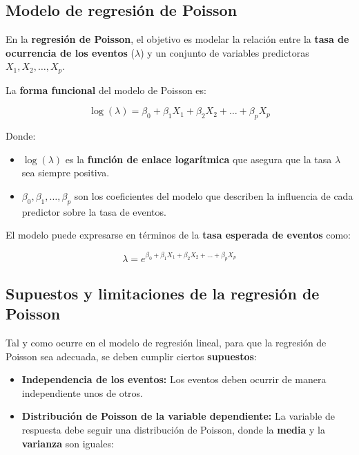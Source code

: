 \documentclass[
  letterpaper,
  DIV=11,
  numbers=noendperiod]{scrreprt}
\providecommand{\tightlist}{%
  \setlength{\itemsep}{0pt}\setlength{\parskip}{0pt}}
\begin{document}
\subsection{Modelo de regresión de
Poisson}\label{modelo-de-regresiuxf3n-de-poisson}

En la \textbf{regresión de Poisson}, el objetivo es modelar la relación
entre la \textbf{tasa de ocurrencia de los eventos} (\(\lambda\)) y un
conjunto de variables predictoras \(X_1, X_2, \dots, X_p\).

La \textbf{forma funcional} del modelo de Poisson es:

\[
\log(\lambda) = \beta_0 + \beta_1 X_1 + \beta_2 X_2 + \dots + \beta_p X_p
\]

Donde:

\begin{itemize}
\tightlist
\item
  \(\log(\lambda)\) es la \textbf{función de enlace logarítmica} que
  asegura que la tasa \(\lambda\) sea siempre positiva.
\item
  \(\beta_0, \beta_1, \dots, \beta_p\) son los coeficientes del modelo
  que describen la influencia de cada predictor sobre la tasa de
  eventos.
\end{itemize}

El modelo puede expresarse en términos de la \textbf{tasa esperada de
eventos} como:

\[
\lambda = e^{\beta_0 + \beta_1 X_1 + \beta_2 X_2 + \dots + \beta_p X_p}
\]

\subsection{Supuestos y limitaciones de la regresión de
Poisson}\label{supuestos-y-limitaciones-de-la-regresiuxf3n-de-poisson}

Tal y como ocurre en el modelo de regresión lineal, para que la
regresión de Poisson sea adecuada, se deben cumplir ciertos
\textbf{supuestos}:

\begin{itemize}
\item
  \textbf{Independencia de los eventos:} Los eventos deben ocurrir de
  manera independiente unos de otros.
\item
  \textbf{Distribución de Poisson de la variable dependiente:} La
  variable de respuesta debe seguir una distribución de Poisson, donde
  la \textbf{media} y la \textbf{varianza} son iguales:
\end{itemize}
\end{document}
